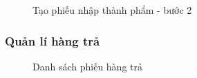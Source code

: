 \begin{figure}[H]
    \begin{center}
        \caption{Tạo phiếu nhập thành phẩm - bước 2}
        \label{mockup_generate_import_2}
    \end{center}
\end{figure}

\subsubsection{Quản lí hàng trả}

\begin{figure}[H]
    \begin{center}
        \caption{Danh sách phiếu hàng trả}
        \label{mockup_list_return_invoice}
    \end{center}
\end{figure}

